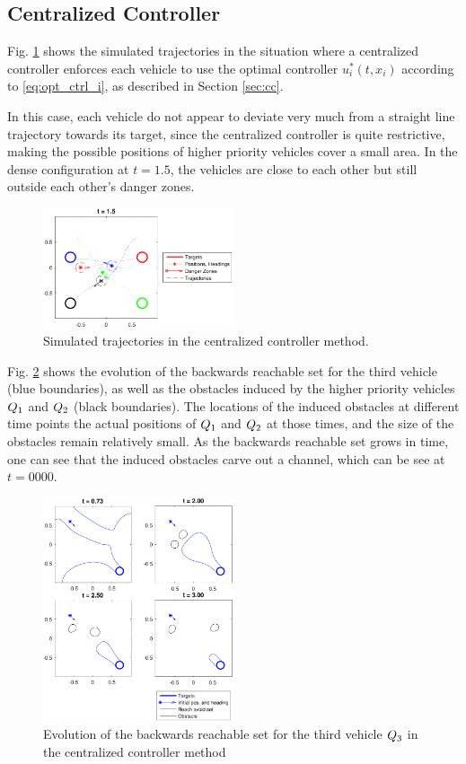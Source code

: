 \subsection{Centralized Controller}
Fig. \ref{fig:cc_traj} shows the simulated trajectories in the situation where a centralized controller enforces each vehicle to use the optimal controller $u^*_i(t, x_i)$ according to \eqref{eq:opt_ctrl_i}, as described in Section \ref{sec:cc}.

In this case, each vehicle do not appear to deviate very much from a straight line trajectory towards its target, since the centralized controller is quite restrictive, making the possible positions of higher priority vehicles cover a small area. In the dense configuration at $t=1.5$, the vehicles are close to each other but still outside each other's danger zones.

\begin{figure}
  \centering
  \includegraphics[width=0.5\textwidth]{"fig/cc_traj"}
  \caption{Simulated trajectories in the centralized controller method.}
  \label{fig:cc_traj}
\end{figure}

Fig. \ref{fig:cc_rs3} shows the evolution of the backwards reachable set for the third vehicle (blue boundaries), as well as the obstacles induced by the higher priority vehicles $Q_1$ and $Q_2$ (black boundaries). The locations of the induced obstacles at different time points the actual positions of $Q_1$ and $Q_2$ at those times, and the size of the obstacles remain relatively small. As the backwards reachable set grows in time, one can see that the induced obstacles carve out a channel, which can be see at $t = 0000$.

\begin{figure}
  \centering
  \includegraphics[width=0.5\textwidth]{"fig/cc_rs3"}
  \caption{Evolution of the backwards reachable set for the third vehicle $Q_3$ in the centralized controller method}
  \label{fig:cc_rs3}
\end{figure}

